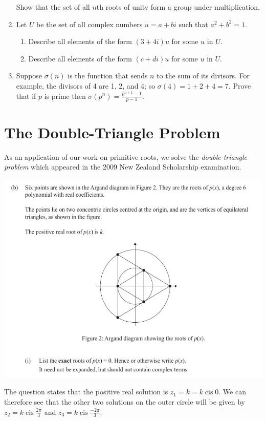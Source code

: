 \documentclass[a4paper,10pt,titlepage]{article}
\theoremstyle{definition}
\DeclareMathOperator{\cis}{cis}
\begin{document}
\begin{enumerate}
\begin{enumerate}
        \end{enumerate}
       Show that the set of all $ n$th roots of unity form a group under multiplication.
  \item Let $ U $ be the set of all complex numbers $ u = a + bi $ such that $ a^2 + b^2 = 1 $.
        \begin{enumerate}
          \item Describe all elements of the form $ (3 + 4i)u $ for some $ u $ in $ U $.
          \item Describe all elements of the form $ (c + di)u $ for some $ u $ in $ U $.
        \end{enumerate}
  \item Suppose $ \sigma(n) $ is the function that sends $ n $ to the sum of its divisors. For example,
        the divisors of 4 are 1, 2, and 4; so $ \sigma(4) = 1 + 2 + 4 = 7 $. Prove that if $ p $ is
        prime then $ \sigma(p^n) = \frac{p^{n+1} - 1}{p - 1} $.
\end{enumerate}

\section{The Double-Triangle Problem}
As an application of our work on primitive roots, we solve the \emph{double-triangle problem} which appeared
in the 2009 New Zealand Scholarship examination.

\includegraphics[width=\textwidth]{double_triangle}

The question states that the positive real solution is $ z_1 = k = k \cis 0 $. We
can therefore see that the other two solutions on the outer circle will be given
by $ z_2 = k \cis \frac{2\pi}{3} $ and $ z_3 = k \cis \frac{-2\pi}{3} $.
\end{document}
